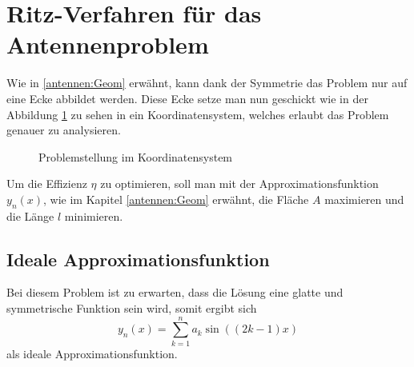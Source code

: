 %
%
% 
%
%



\section{Ritz-Verfahren für das Antennenproblem\label{antennen:ritzAnw}}

Wie in \ref{antennen:Geom} erwähnt, kann dank der Symmetrie das Problem nur auf eine Ecke abbildet werden. 
Diese Ecke setze man nun geschickt wie in der Abbildung \ref{antennen:koordSysBsp} zu sehen 
in ein Koordinatensystem, welches erlaubt das Problem genauer zu analysieren.
\begin{figure}
	\centering
	\caption{Problemstellung im Koordinatensystem}
	\label{antennen:koordSysBsp}
\end{figure}

Um die Effizienz $\eta$ zu optimieren, soll man mit der Approximationsfunktion
$y_n(x)$, wie im Kapitel \ref{antennen:Geom} erwähnt, die Fläche $A$ 
maximieren und die Länge $l$ minimieren.

\subsection{Ideale Approximationsfunktion\label{antennen:unsereApproxFunkt}}

Bei diesem Problem ist zu erwarten, dass die Lösung eine glatte und symmetrische
Funktion sein wird, somit ergibt sich
\begin{equation}
	y_n(x)
	= 
	\sum_{k=1}^n a_k\sin((2k-1)x)
	\label{antennen:unserRitz}
\end{equation}
als ideale Approximationsfunktion. 

